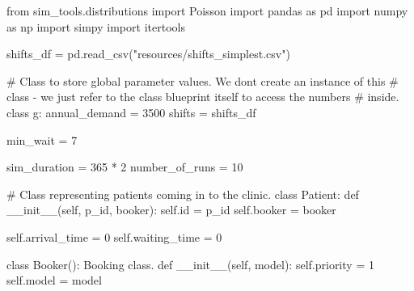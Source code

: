 \documentclass[
  letterpaper,
  DIV=11,
  numbers=noendperiod]{scrreprt}
\newenvironment{Shaded}{\begin{snugshade}}{\end{snugshade}}
\newcommand{\BuiltInTok}[1]{\textcolor[rgb]{0.00,0.23,0.31}{#1}}
\newcommand{\CommentTok}[1]{\textcolor[rgb]{0.37,0.37,0.37}{#1}}
\newcommand{\DecValTok}[1]{\textcolor[rgb]{0.68,0.00,0.00}{#1}}
\newcommand{\FunctionTok}[1]{\textcolor[rgb]{0.28,0.35,0.67}{#1}}
\newcommand{\ImportTok}[1]{\textcolor[rgb]{0.00,0.46,0.62}{#1}}
\newcommand{\KeywordTok}[1]{\textcolor[rgb]{0.00,0.23,0.31}{#1}}
\newcommand{\NormalTok}[1]{\textcolor[rgb]{0.00,0.23,0.31}{#1}}
\newcommand{\OperatorTok}[1]{\textcolor[rgb]{0.37,0.37,0.37}{#1}}
\newcommand{\StringTok}[1]{\textcolor[rgb]{0.13,0.47,0.30}{#1}}
\newcommand{\VariableTok}[1]{\textcolor[rgb]{0.07,0.07,0.07}{#1}}
\begin{document}
\begin{tcolorbox}[enhanced jigsaw, rightrule=.15mm, colback=white, colframe=quarto-callout-note-color-frame, colbacktitle=quarto-callout-note-color!10!white, toprule=.15mm, coltitle=black, opacityback=0, titlerule=0mm, bottomtitle=1mm, breakable, title=\textcolor{quarto-callout-note-color}{\faInfo}\hspace{0.5em}{Click here to view the full code}, opacitybacktitle=0.6, toptitle=1mm, arc=.35mm, bottomrule=.15mm, leftrule=.75mm, left=2mm]

\label{annotated-cell-283}%
\begin{Shaded}
\begin{Highlighting}[]
\ImportTok{from}\NormalTok{ sim\_tools.distributions }\ImportTok{import}\NormalTok{ Poisson}
\ImportTok{import}\NormalTok{ pandas }\ImportTok{as}\NormalTok{ pd}
\ImportTok{import}\NormalTok{ numpy }\ImportTok{as}\NormalTok{ np}
\ImportTok{import}\NormalTok{ simpy}
\ImportTok{import}\NormalTok{ itertools}

\NormalTok{shifts\_df }\OperatorTok{=}\NormalTok{ pd.read\_csv(}\StringTok{"resources/shifts\_simplest.csv"}\NormalTok{)}

\CommentTok{\# Class to store global parameter values.  We don\textquotesingle{}t create an instance of this}
\CommentTok{\# class {-} we just refer to the class blueprint itself to access the numbers}
\CommentTok{\# inside.}
\KeywordTok{class}\NormalTok{ g:}
\NormalTok{    annual\_demand }\OperatorTok{=} \DecValTok{3500}
\NormalTok{    shifts }\OperatorTok{=}\NormalTok{ shifts\_df}

\NormalTok{    min\_wait }\OperatorTok{=} \DecValTok{7}

\NormalTok{    sim\_duration }\OperatorTok{=} \DecValTok{365} \OperatorTok{*} \DecValTok{2}
\NormalTok{    number\_of\_runs }\OperatorTok{=} \DecValTok{10}

\CommentTok{\# Class representing patients coming in to the clinic.}
\KeywordTok{class}\NormalTok{ Patient:}
    \KeywordTok{def} \FunctionTok{\_\_init\_\_}\NormalTok{(}\VariableTok{self}\NormalTok{, p\_id, booker):}
        \VariableTok{self}\NormalTok{.}\BuiltInTok{id} \OperatorTok{=}\NormalTok{ p\_id}
        \VariableTok{self}\NormalTok{.booker }\OperatorTok{=}\NormalTok{ booker}

        \VariableTok{self}\NormalTok{.arrival\_time }\OperatorTok{=} \DecValTok{0}
        \VariableTok{self}\NormalTok{.waiting\_time }\OperatorTok{=} \DecValTok{0}

\KeywordTok{class}\NormalTok{ Booker():}
    \CommentTok{\textquotesingle{}\textquotesingle{}\textquotesingle{}}
\CommentTok{    Booking class.}
\CommentTok{    \textquotesingle{}\textquotesingle{}\textquotesingle{}}
    \KeywordTok{def} \FunctionTok{\_\_init\_\_}\NormalTok{(}\VariableTok{self}\NormalTok{, model):}
        \VariableTok{self}\NormalTok{.priority }\OperatorTok{=} \DecValTok{1}
        \VariableTok{self}\NormalTok{.model }\OperatorTok{=}\NormalTok{ model}


\end{Highlighting}
\end{Shaded}
\end{tcolorbox}
\end{document}
